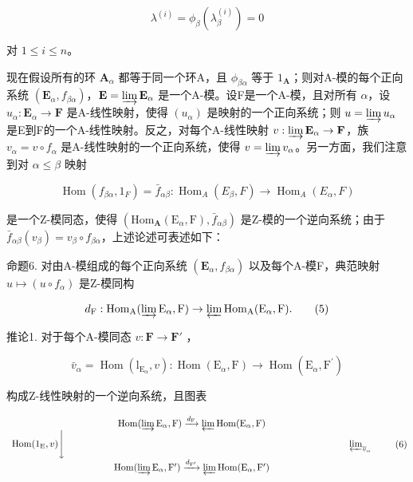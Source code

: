 \[
\lambda^ {(i)} = \phi_ {\beta} (\lambda_ {\beta} ^ {(i)}) = 0
\]

对 \(1 \leqslant i \leqslant n\)。

现在假设所有的环 \(\mathbf{A}_{\alpha}\) 都等于同一个环A，且 \(\phi_{\beta \alpha}\) 等于 \(1_{\mathbf{A}}\)；则对A-模的每个正向系统 \((\mathbf{E}_{\alpha}, f_{\beta \alpha})\)，\(\mathbf{E} = \varinjlim \mathbf{E}_{\alpha}\) 是一个A-模。设F是一个A-模，且对所有 \(\alpha\)，设 \(u_{\alpha}: \mathbf{E}_{\alpha} \to \mathbf{F}\) 是A-线性映射，使得 \((u_{\alpha})\) 是映射的一个正向系统；则 \(u = \varinjlim u_{\alpha}\) 是E到F的一个A-线性映射。反之，对每个A-线性映射 \(v: \varinjlim \mathbf{E}_{\alpha} \to \mathbf{F}\)，族 \(v_{\alpha} = v \circ f_{\alpha}\) 是A-线性映射的一个正向系统，使得 \(v = \varinjlim v_{\alpha}\)。另一方面，我们注意到对 \(\alpha \leqslant \beta\) 映射

\[
\operatorname{Hom} (f _ {\beta \alpha}, 1 _ {F}) = \bar {f} _ {\alpha \beta}: \operatorname{Hom} _ {A} (E _ {\beta}, F) \rightarrow \operatorname{Hom} _ {A} (E _ {\alpha}, F)
\]

是一个Z-模同态，使得 \((\mathrm{Hom}_{\mathbf{A}}(\mathrm{E}_{\alpha},\mathrm{F}),\bar{f}_{\alpha\beta})\) 是Z-模的一个逆向系统；由于 \(\bar{f}_{\alpha\beta}(v_{\beta}) = v_{\beta} \circ f_{\beta\alpha}\)，上述论述可表述如下：

命题6. 对由A-模组成的每个正向系统 \((\mathbf{E}_{\alpha}, f_{\beta \alpha})\) 以及每个A-模F，典范映射 \(u \mapsto (u \circ f_{\alpha})\) 是Z-模同构

\[
d _ {\mathrm{F}}: \operatorname{Hom} _ {\mathrm{A}} (\varinjlim \mathrm{E} _ {\alpha}, \mathrm{F}) \rightarrow \varprojlim \operatorname{Hom} _ {\mathrm{A}} (\mathrm{E} _ {\alpha}, \mathrm{F}).\tag{5}
\]

推论1. 对于每个A-模同态 \(v: \mathbf{F} \to \mathbf{F}'\) ，

\[
\bar {v} _ {\alpha} = \operatorname{Hom} \left(\mathrm{l} _ {\mathrm{E} _ {\alpha}}, v\right): \operatorname{Hom} \left(\mathrm{E} _ {\alpha}, \mathrm{F}\right)\rightarrow \operatorname{Hom} \left(\mathrm{E} _ {\alpha}, \mathrm{F} ^ {\prime}\right)
\]

构成Z-线性映射的一个逆向系统，且图表

\[
\begin{array}{c} \operatorname{Hom} (\varinjlim \mathrm{E} _ {\alpha}, \mathrm{F}) \xrightarrow {d _ {\mathrm{F}}} \varprojlim \operatorname{Hom} (\mathrm{E} _ {\alpha}, \mathrm{F}) \\ \operatorname{Hom} (1 _ {\mathrm{E}}, v) \Bigg \downarrow \qquad \qquad \qquad \qquad \qquad \qquad \qquad \qquad \qquad \qquad \qquad \qquad \qquad \qquad \qquad \varprojlim_ {\overline {{v}} _ {\alpha}} \\ \operatorname{Hom} (\varinjlim \mathrm{E} _ {\alpha}, \mathrm{F} ^ {\prime}) \xrightarrow {d _ {\mathrm{F} ^ {\prime}}} \varprojlim \operatorname{Hom} (\mathrm{E} _ {\alpha}, \mathrm{F} ^ {\prime}) \end{array}\tag{6}
\]

